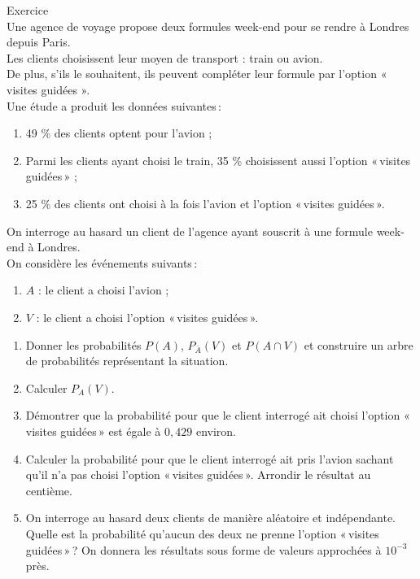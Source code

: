 \documentclass[a4paper,11pt,eval]{nsi}
\newcounter{exoNum}
\newcommand{\exo}[1]
{
	\addtocounter{exoNum}{1}
	{\titlefont\color{UGLiBlue}\Large Exercice\ \theexoNum\ \normalsize{#1}}\smallskip	
}
\begin{document}
\exo{}\\
Une agence de voyage propose deux formules week-end pour se rendre à Londres depuis Paris.\\ Les clients choisissent leur moyen de transport : train ou avion.\\ De plus, s'ils le souhaitent, ils peuvent compléter leur formule par l'option  « visites guidées ».\\[.5em]
Une étude a produit les données suivantes\,:
\begin{enumerate}[label=\textbullet]
    \item 49 \% des clients optent pour l'avion ;
    \item Parmi les clients ayant choisi le train, 35 \% choisissent aussi l'option  «\,visites guidées\,» ;
    \item 25 \% des clients ont choisi à la fois l'avion et l'option  «\,visites guidées\,».
\end{enumerate}

 On interroge au hasard un client de l'agence ayant souscrit à une formule week-end à Londres.\\ On considère les événements suivants\,:
 \begin{enumerate}[label=\textbullet]
     \item $A$ :  le client a choisi l'avion ;
     \item $V$ : le client a choisi l'option  «\,visites guidées\,».
 \end{enumerate}

\begin{enumerate}
    \item Donner les probabilités $P(A)$, $P_{\bar{A}}(V)$ et $P(A \cap V)$ et construire un arbre de probabilités représentant la situation.\\[.5em]
    \item Calculer $P_A(V)$.\\[.5em]
    \item Démontrer que la probabilité pour que le client interrogé ait choisi l'option  «\,visites guidées\,»  est égale à $0{,}429$ environ.\\[.5em]
    \item Calculer la probabilité pour que le client interrogé ait pris l'avion sachant qu'il n'a pas choisi l'option  «\,visites guidées\,». Arrondir le résultat au centième.\\[.5em]
    \item On interroge au hasard deux clients de manière aléatoire et indépendante.\\ Quelle est la probabilité qu'aucun des deux ne prenne l'option  «\,visites guidées\,»\,? On donnera les résultats sous forme de valeurs approchées à $10^{-3}$ près.\\[.5em]
\end{enumerate}
\end{document}
